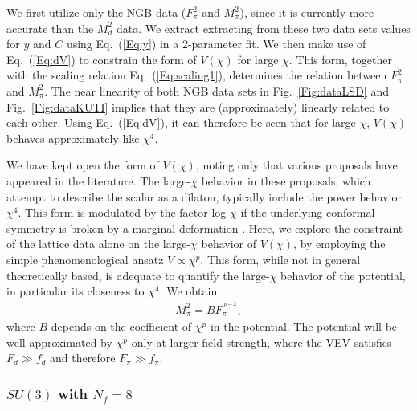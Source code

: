 \documentclass[a4paper,11pt]{article}
\newcommand{\beqs}{\begin{eqnarray}}
\newcommand{\eeqs}{\end{eqnarray}}
\begin{document}
We first utilize only the NGB data ($F_{\pi}^2$ and $M_{\pi}^2$), since it is currently more accurate than the $M_d^2$ data. We extract extracting from these two data sets values for $y$ and $C$ using Eq.~(\ref{Eq:y}) in a 2-parameter fit. We then make use of  Eq.~(\ref{Eq:dV}) to constrain the form of $V(\chi)$ for large $\chi$. This form, together with the scaling relation Eq.~(\ref{Eq:scaling1}), determines the relation between $F_{\pi}^2$ and $M_{\pi}^2$. The near linearity of both NGB data sets in Fig.~\ref{Fig:dataLSD} and Fig.~\ref{Fig:dataKUTI} implies that they are (approximately) linearly related to each other. Using Eq.~(\ref{Eq:dV}), it can therefore be seen that for large $\chi$, $V(\chi)$ behaves approximately like $\chi^4$.

We have kept open the form of $V(\chi)$, noting only that various proposals have appeared in the literature. The large-$\chi$ behavior in these proposals, which attempt to describe the scalar as a dilaton, typically include the power behavior $\chi^4$. This form is modulated by the factor log $\chi$ if the underlying conformal symmetry is broken by a marginal deformation \cite{GGS}. Here, we explore the constraint of the lattice data alone on the large-$\chi$ behavior of $V(\chi)$, by employing the simple phenomenological ansatz $V \propto \chi^p$. This form, while not in general theoretically based, is adequate to quantify the large-$\chi$ behavior of the potential, in particular its closeness to $\chi^4$. We obtain 
\beqs
M^2_\pi = B F_\pi^{^{\;\scriptstyle{p-2}}},
\label{Eq:pB}
\eeqs
where $B$ depends on the coefficient of $\chi^p$ in the potential. The potential will be well approximated by $\chi^p$ only at larger field strength, where the VEV satisfies $F_d \gg f_d$ and therefore $F_\pi\gg f_\pi$.



\subsubsection{$SU(3)$ with $N_f=8$}
\label{Sec:LSD}
\end{document}
